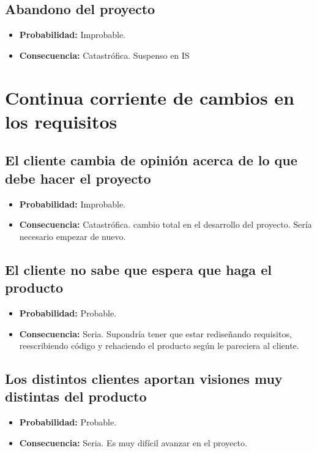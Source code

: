 \documentclass[spanish,a4paper,12pt]{report}	%
\begin{document}
	\subsection*{Abandono del proyecto}
		\begin{itemize}
			\item \textbf {Probabilidad: }Improbable.
			\item \textbf {Consecuencia: }Catastrófica. Suspenso en IS 	%
		\end{itemize}

%
\section{Continua corriente de cambios en los requisitos}

	\subsection*{El cliente cambia de opinión acerca de lo que debe hacer el proyecto}
		\begin{itemize}
			\item \textbf {Probabilidad: }Improbable.
			\item \textbf {Consecuencia: }Catastrófica. cambio total en el desarrollo del proyecto. Sería necesario empezar de nuevo.
		\end{itemize}
	
	\subsection*{El cliente no sabe que espera que haga el producto}	
		\begin{itemize}
			\item \textbf {Probabilidad: }Probable.
			\item \textbf {Consecuencia: }Seria. Supondría tener que estar rediseñando requisitos, reescribiendo código y rehaciendo el producto según le pareciera al cliente.
		\end{itemize}
	
	\subsection*{Los distintos clientes aportan visiones muy distintas del producto}	
		\begin{itemize}
			\item \textbf {Probabilidad: }Probable.
			\item \textbf {Consecuencia: }Seria. Es muy difícil avanzar en el proyecto.
		\end{itemize}
\end{document}
